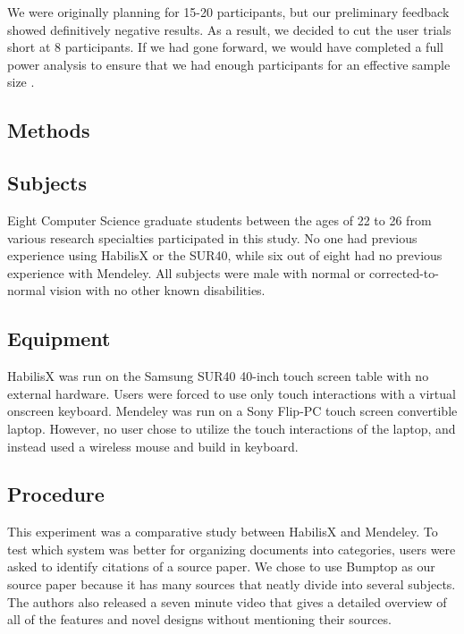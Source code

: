 \documentclass{article}
\begin{document}
	We were originally planning for 15-20 participants, but our preliminary feedback showed definitively negative results.  As a result, we decided to cut the user trials short at 8 participants.  If we had gone forward, we would have completed a full power analysis to ensure that we had enough participants for an effective sample size \cite{Lenth2001}.  
	





\subsection{Methods}
\subsection*{Subjects}
	Eight Computer Science graduate students between the ages of 22 to 26 from various research specialties participated in this study.  No one had previous experience using HabilisX or the SUR40, while six out of eight had no previous experience with Mendeley. All subjects were male with  normal or corrected-to-normal vision with no other known disabilities. 
\subsection*{Equipment}
	HabilisX was run on the Samsung SUR40 40-inch touch screen table with no external hardware.  Users were forced to use only touch interactions with a virtual onscreen keyboard. Mendeley was run on a Sony Flip-PC touch screen convertible laptop.  However, no user chose to utilize the touch interactions of the laptop, and instead used a wireless mouse and build in keyboard.  
	
\subsection*{Procedure}

	This experiment was a comparative study between HabilisX and Mendeley.  To test which system was better for organizing documents into categories, users were asked to identify citations of a source paper.  We chose to use Bumptop \cite{Agarawala2006}
	as our source paper because it has many sources that neatly divide into several subjects.  The authors also released a seven minute video that gives a detailed overview of all of the features and novel designs without mentioning their sources.   
	
\end{document}
